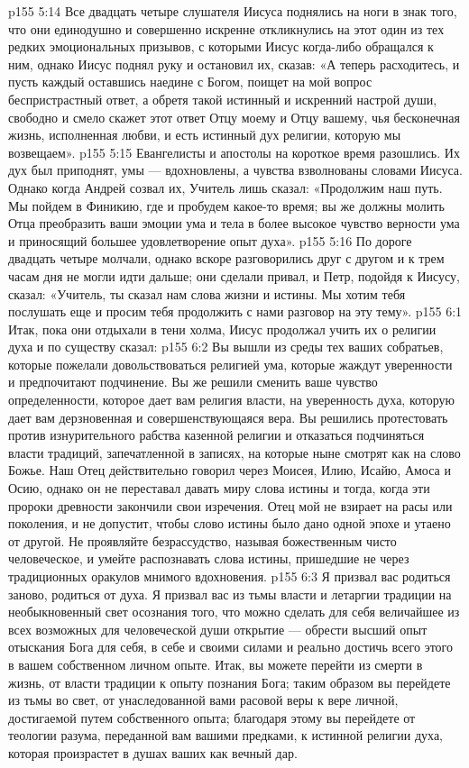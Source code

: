 \vs p155 5:14 Все двадцать четыре слушателя Иисуса поднялись на ноги в знак того, что они единодушно и совершенно искренне откликнулись на этот один из тех редких эмоциональных призывов, с которыми Иисус когда\hyp{}либо обращался к ним, однако Иисус поднял руку и остановил их, сказав: «А теперь расходитесь, и пусть каждый оставшись наедине с Богом, поищет на мой вопрос беспристрастный ответ, а обретя такой истинный и искренний настрой души, свободно и смело скажет этот ответ Отцу моему и Отцу вашему, чья бесконечная жизнь, исполненная любви, и есть истинный дух религии, которую мы возвещаем».
\vs p155 5:15 Евангелисты и апостолы на короткое время разошлись. Их дух был приподнят, умы --- вдохновлены, а чувства взволнованы словами Иисуса. Однако когда Андрей созвал их, Учитель лишь сказал: «Продолжим наш путь. Мы пойдем в Финикию, где и пробудем какое\hyp{}то время; вы же должны молить Отца преобразить ваши эмоции ума и тела в более высокое чувство верности ума и приносящий большее удовлетворение опыт духа».
\vs p155 5:16 По дороге двадцать четыре молчали, однако вскоре разговорились друг с другом и к трем часам дня не могли идти дальше; они сделали привал, и Петр, подойдя к Иисусу, сказал: «Учитель, ты сказал нам слова жизни и истины. Мы хотим тебя послушать еще и просим тебя продолжить с нами разговор на эту тему».
\vs p155 6:1 Итак, пока они отдыхали в тени холма, Иисус продолжал учить их о религии духа и по существу сказал:
\vs p155 6:2 \pc Вы вышли из среды тех ваших собратьев, которые пожелали довольствоваться религией ума, которые жаждут уверенности и предпочитают подчинение. Вы же решили сменить ваше чувство определенности, которое дает вам религия власти, на уверенность духа, которую дает вам дерзновенная и совершенствующаяся вера. Вы решились протестовать против изнурительного рабства казенной религии и отказаться подчиняться власти традиций, запечатленной в записях, на которые ныне смотрят как на слово Божье. Наш Отец действительно говорил через Моисея, Илию, Исайю, Амоса и Осию, однако он не переставал давать миру слова истины и тогда, когда эти пророки древности закончили свои изречения. Отец мой не взирает на расы или поколения, и не допустит, чтобы слово истины было дано одной эпохе и утаено от другой. Не проявляйте безрассудство, называя божественным чисто человеческое, и умейте распознавать слова истины, пришедшие не через традиционных оракулов мнимого вдохновения.
\vs p155 6:3 \pc Я призвал вас родиться заново, родиться от духа. Я призвал вас из тьмы власти и летаргии традиции на необыкновенный свет осознания того, что можно сделать для себя величайшее из всех возможных для человеческой души открытие --- обрести высший опыт отыскания Бога для себя, в себе и своими силами и реально достичь всего этого в вашем собственном личном опыте. Итак, вы можете перейти из смерти в жизнь, от власти традиции к опыту познания Бога; таким образом вы перейдете из тьмы во свет, от унаследованной вами расовой веры к вере личной, достигаемой путем собственного опыта; благодаря этому вы перейдете от теологии разума, переданной вам вашими предками, к истинной религии духа, которая произрастет в душах ваших как вечный дар.
